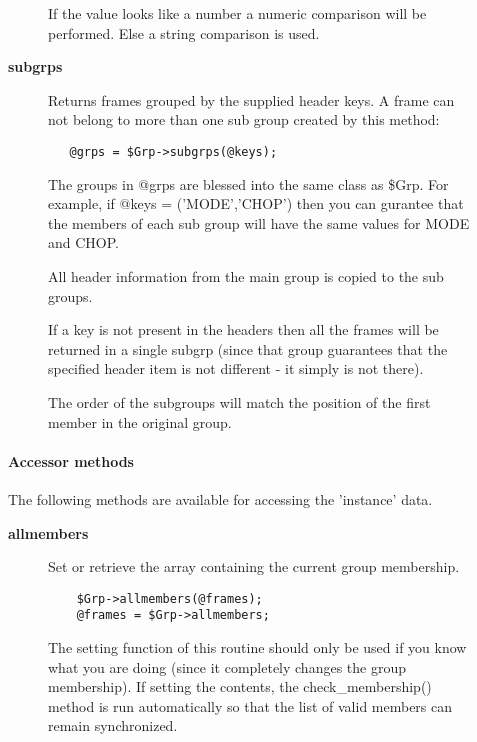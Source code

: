 \begin{description}
\begin{description}
If the value looks like a number a numeric comparison will be performed.
Else a string comparison is used.


\item[{\textbf{subgrps}}] \mbox{}

Returns frames grouped by the supplied header keys.
A frame can not belong to more than one sub group created by this
method:

\begin{verbatim}
   @grps = $Grp->subgrps(@keys);
\end{verbatim}


The groups in @grps are blessed into the same class as \$Grp.
For example, if @keys = ('MODE','CHOP') then you can gurantee
that the members of each sub group will have the same values
for MODE and CHOP.



All header information from the main group is copied to the
sub groups.



If a key is not present in the headers then all the frames
will be returned in a single subgrp (since that group guarantees
that the specified header item is not different - it simply
is not there).



The order of the subgroups will match the position of the first
member in the original group.

\end{description}
\paragraph*{Accessor methods\label{ORAC::Group_Accessor_methods}}


The following methods are available for accessing the
'instance' data.

\begin{description}

\item[{\textbf{allmembers}}] \mbox{}

Set or retrieve the array containing the current group membership.

\begin{verbatim}
    $Grp->allmembers(@frames);
    @frames = $Grp->allmembers;
\end{verbatim}


The setting function of this routine should only be used
if you know what you are doing (since it completely changes the group
membership). If setting the contents, the check\_membership() method
is run automatically so that the list of valid members can remain
synchronized.




\end{description}
\end{description}
